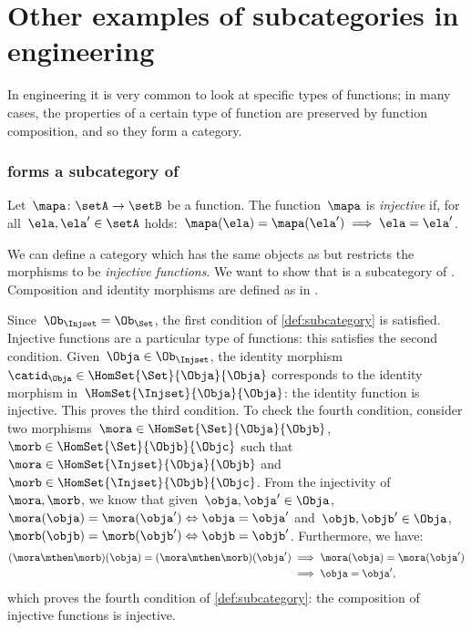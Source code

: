 \section{Other examples of subcategories in engineering}

In engineering it is very common to look at specific types of functions; in many cases, the properties of a certain type of function are preserved by function composition, and so they form a category.

\subsubsection{\Injset forms a subcategory of \Set}
\begin{definition}
  \label{def:injective-function}
  Let~$\mapa \colon \setA\to \setB$ be a function. The function~$\mapa$ is \emph{injective} if, for all~$\ela,\ela'\in \setA$ holds:~$\mapa(\ela)=\mapa(\ela')\implies \ela=\ela'$.
\end{definition}


\begin{example}
  We can define a category \iindex{\Injset} which has the same objects as \Set but restricts the morphisms to be \emph{injective functions}.
  We want to show that \Injset is a subcategory of \Set. Composition and identity morphisms are defined as in \Set.

  Since~$\Ob_{\Injset}=\Ob_{\Set}$, the first condition of \cref{def:subcategory} is satisfied. Injective functions are a particular type of functions: this satisfies the second condition. Given~$\Obja\in \Ob_{\Injset}$, the identity morphism~$\catid_\Obja\in \HomSet{\Set}{\Obja}{\Obja}$ corresponds to the identity morphism in~$\HomSet{\Injset}{\Obja}{\Obja}$: the identity function is injective. This proves the third condition. To check the fourth condition, consider two morphisms~$\mora \in \HomSet{\Set}{\Obja}{\Objb}$,~$\morb \in \HomSet{\Set}{\Objb}{\Objc}$ such that~$\mora \in \HomSet{\Injset}{\Obja}{\Objb}$ and~$\morb\in \HomSet{\Injset}{\Objb}{\Objc}$. From the injectivity of~$\mora,\morb$, we know that given~$\obja,\obja'\in \Obja$, $\mora(\obja)=\mora(\obja') \Leftrightarrow \obja=\obja'$ and~$\objb,\objb'\in \Obja$,~$\morb(\objb)=\morb(\objb') \Leftrightarrow \objb=\objb'$. Furthermore, we have:
  \begin{equation*}
    \begin{aligned}
    (\mora \mthen \morb)(\obja)
      =(\mora \mthen \morb)(\obja')&\implies \mora(\obja)=\mora(\obja')\\
      &\implies \obja=\obja',
    \end{aligned}
  \end{equation*}
  which proves the fourth condition of \cref{def:subcategory}: the composition of injective functions is injective.
\end{example}



